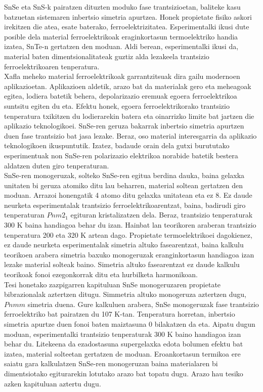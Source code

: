 SnSe eta SnS-k pairatzen dituzten moduko fase trantsizioetan, baliteke kasu batzuetan sistemaren inbertsio simetria 
apurtzea. Honek propietate fisiko askori irekitzen die atea, esate baterako, ferroelektrizitatea. Esperimentalki 
ikusi dute posible dela material ferroelektrikoak eraginkortasun termoelektriko handia izatea, SnTe-n gertatzen 
den moduan. Aldi berean, esperimentalki ikusi da, material baten dimentsionalitateak guztiz alda lezakeela 
trantsizio ferroelektrikoaren tenperatura. \\

Xafla meheko material ferroelektrikoak garrantzitsuak dira gailu modernoen aplikazioetan. Aplikazioen aldetik, 
arazo bat da materialak gero eta meheagoak egitea, lodiera batetik behera, depolarizazio eremuak egoera 
ferroelektrikoa suntsitu egiten du eta. Efektu honek, egoera ferroelektrikorako trantsizio tenperatura txikitzen du 
lodierarekin batera eta oinarrizko limite bat jartzen die aplikazio teknologikoei. SnSe-ren geruza bakarrak inbertsio 
simetria apurtzen duen fase trantsizio bat jasa lezake. Beraz, oso material interesgarria da aplikazio teknologikoen 
ikuspuntutik. Izatez, badaude orain dela gutxi burututako esperimentuak non SnSe-ren polarizazio elektrikoa 
norabide batetik bestera aldatzen duten giro tenperaturan. \\

SnSe-ren monogeruzak, solteko SnSe-ren egitua berdina dauka, baina gelaxka unitaten bi geruza atomiko ditu lau 
beharren, material soltean gertatzen den moduan. Arrazoi honengatik 4 atomo ditu gelaxka unitatean eta ez 8. Ez 
daude neurketa esperimentalak trantsizio ferroelektrikoarentzat, baina, badirudi giro tenperaturan $Pnm2_{1}$ 
egituran kristalizatzen dela. Beraz, trantsizio tenperaturak 300 K baina handiagoa behar du izan. Hainbat lan 
teorikoren araberan trantsizio tenperatura 200 eta 320 K artean dago. Propietate termoelektrikoei dagokienez, ez 
daude neurketa esperimentalak simetria altuko fasearentzat, baina kalkulu teorikoen arabera simetria baxuko 
monogeruzak eranginkortasun handiagoa izan lezake material solteak baino. Simetria altuko fasearentzat ez daude 
kalkulu teorikoak fonoi ezegonkorrak ditu eta hurbilketa harmonikoan. \\

Tesi honetako zazpigarren kapituluan SnSe monogeruzaren propietate bibrazionalak aztertzen ditugu. Simmetria altuko 
monogeruza aztertzen dugu, $Pnmm$ simetria duena. Gure kalkuluen arabera, SnSe monogeruzak fase trantsizio 
ferroelektriko bat pairatzen du 107 K-tan. Tenperatura horretan, inbertsio simetria apurtze duen fonoi baten 
maiztasuna 0 bilakatzen da eta. Aipatu dugun moduan, esperimentalki trantsizio tenperaturak 300 K baino handiagoa 
izan behar du. Litekeena da ezadostasuna supergelaxka edota bolumen efektu bat izatea, material solteetan gertatzen 
de moduan. Eroankortasun termikoa ere saiatu gara kalkulatzen SnSe-ren monogeruzan baina materialaren bi 
dimentsiotako egiturarekin lotutako arazo bat topatu dugu. Arazo hau tesiko azken kapituluan aztertu dugu. \\

